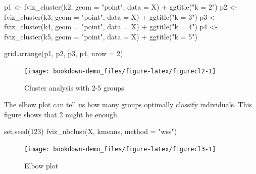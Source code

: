 \documentclass[
]{book}
\newenvironment{Shaded}{\begin{snugshade}}{\end{snugshade}}
\newcommand{\AttributeTok}[1]{\textcolor[rgb]{0.77,0.63,0.00}{#1}}
\newcommand{\DecValTok}[1]{\textcolor[rgb]{0.00,0.00,0.81}{#1}}
\newcommand{\FunctionTok}[1]{\textcolor[rgb]{0.00,0.00,0.00}{#1}}
\newcommand{\NormalTok}[1]{#1}
\newcommand{\OtherTok}[1]{\textcolor[rgb]{0.56,0.35,0.01}{#1}}
\newcommand{\SpecialCharTok}[1]{\textcolor[rgb]{0.00,0.00,0.00}{#1}}
\newcommand{\StringTok}[1]{\textcolor[rgb]{0.31,0.60,0.02}{#1}}
\begin{document}
\begin{Shaded}
\begin{Highlighting}[]
\NormalTok{p1 }\OtherTok{\textless{}{-}} \FunctionTok{fviz\_cluster}\NormalTok{(k2, }\AttributeTok{geom =} \StringTok{"point"}\NormalTok{, }\AttributeTok{data =}\NormalTok{ X) }\SpecialCharTok{+} \FunctionTok{ggtitle}\NormalTok{(}\StringTok{"k = 2"}\NormalTok{)}
\NormalTok{p2 }\OtherTok{\textless{}{-}} \FunctionTok{fviz\_cluster}\NormalTok{(k3, }\AttributeTok{geom =} \StringTok{"point"}\NormalTok{,  }\AttributeTok{data =}\NormalTok{ X) }\SpecialCharTok{+} \FunctionTok{ggtitle}\NormalTok{(}\StringTok{"k = 3"}\NormalTok{)}
\NormalTok{p3 }\OtherTok{\textless{}{-}} \FunctionTok{fviz\_cluster}\NormalTok{(k4, }\AttributeTok{geom =} \StringTok{"point"}\NormalTok{,  }\AttributeTok{data =}\NormalTok{ X) }\SpecialCharTok{+} \FunctionTok{ggtitle}\NormalTok{(}\StringTok{"k = 4"}\NormalTok{)}
\NormalTok{p4 }\OtherTok{\textless{}{-}} \FunctionTok{fviz\_cluster}\NormalTok{(k5, }\AttributeTok{geom =} \StringTok{"point"}\NormalTok{,  }\AttributeTok{data =}\NormalTok{ X) }\SpecialCharTok{+} \FunctionTok{ggtitle}\NormalTok{(}\StringTok{"k = 5"}\NormalTok{)}

\FunctionTok{grid.arrange}\NormalTok{(p1, p2, p3, p4, }\AttributeTok{nrow =} \DecValTok{2}\NormalTok{)}
\end{Highlighting}
\end{Shaded}

\begin{figure}[H]

{\centering \texttt{[image: bookdown-demo\_files/figure-latex/figurecl2-1]} 

}

\caption{Cluster analysis with 2-5 groups}\label{fig:figurecl2}
\end{figure}

The elbow plot can tell us how many groups optimally classify individuals. This figure shows that 2 might be enough.

\begin{Shaded}
\begin{Highlighting}[]
\FunctionTok{set.seed}\NormalTok{(}\DecValTok{123}\NormalTok{)}
\FunctionTok{fviz\_nbclust}\NormalTok{(X, kmeans, }\AttributeTok{method =} \StringTok{"wss"}\NormalTok{)}
\end{Highlighting}
\end{Shaded}

\begin{figure}[H]

{\centering \texttt{[image: bookdown-demo\_files/figure-latex/figurecl3-1]} 

}

\caption{Elbow plot}\label{fig:figurecl3}
\end{figure}
\end{document}
